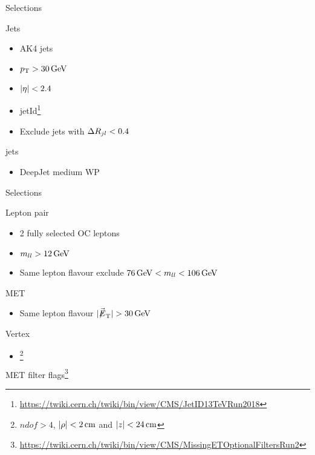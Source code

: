 \documentclass[18pt]{beamer}
\begin{document}
\begin{frame}{Selections}
	\begin{multicols}{2}
		Jets
		\begin{itemize}
			\item AK4 jets
			\item $p_{\text{T}}>\SI{30}{\giga\electronvolt}$
			\item $|\eta|<2.4$
			\item {} jetId\footnote{\url{https://twiki.cern.ch/twiki/bin/view/CMS/JetID13TeVRun2018}}
			\item Exclude jets with $\Delta R_{jl}<0.4$
		\end{itemize}
		\vfill\null
		\columnbreak
		\bottomquark jets
		\begin{itemize}
			\item DeepJet medium WP
		\end{itemize}	
	\end{multicols}	
\end{frame}

\begin{frame}{Selections}
	\begin{multicols}{2}
		Lepton pair
		\begin{itemize}
			\item 2 fully selected OC leptons
			\item $m_{ll}>\SI{12}{\giga\electronvolt}$
			\item Same lepton flavour exclude $\SI{76}{\giga\electronvolt}<m_{ll}<\SI{106}{\giga\electronvolt}$
		\end{itemize}
		\vfill\null
		\columnbreak
		MET
		\begin{itemize}
			\item Same lepton flavour $\abs{\met}>\SI{30}{\giga\electronvolt}$
		\end{itemize}	
	\end{multicols}
	Vertex
	\begin{itemize}
		\item {}\footnote{$ndof>4$, $|\rho|<\SI{2}{\centi\metre}$ and $|z|<\SI{24}{\centi\metre}$}
	\end{itemize}	
\end{frame}

\begin{frame}{MET filter flags\footnote{\url{https://twiki.cern.ch/twiki/bin/view/CMS/MissingETOptionalFiltersRun2}}}
	
\end{frame}
\end{document}
